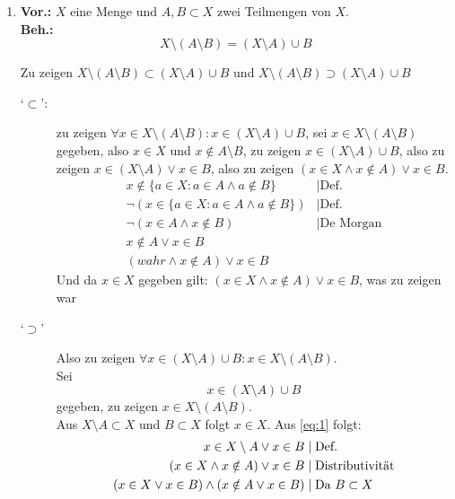 \documentclass{gadsescript}
\begin{document}
\begin{enumerate}[label=\alph*)]
	\item \textbf{Vor.:} $ X $ eine Menge und $ A, B \subset X $ zwei Teilmengen von $ X $.\\
		\textbf{Beh.:}
		\[ X \setminus ( A \setminus B ) = ( X \setminus A ) \cup B \]
		\begin{proof*}
			Zu zeigen $ X \setminus ( A \setminus B ) \subset ( X \setminus A ) \cup B $ und $ X \setminus ( A \setminus B ) \supset ( X \setminus A ) \cup B $
			\begin{description}
				\item[`$\subset$':] zu zeigen $ \forall x \in X \setminus ( A \setminus B ) : x \in ( X\setminus A) \cup B $, sei $ x \in X \setminus ( A \setminus B ) $ gegeben, also $ x \in X $ und $ x \notin A \setminus B $,
					zu zeigen $ x \in ( X \setminus A ) \cup B $, also zu zeigen $ x \in ( X \setminus A ) \vee x \in B $, also zu zeigen $ \left( x \in X \wedge  x \notin A \right) \vee x \in B $.
					\begin{align*}
						x \notin \{ a \in X : a \in A \wedge a \notin B \} &\mid \text{Def.}\\
						\neg \left( x \in \{ a \in X : a \in A \wedge a \notin B \} \right) &\mid \text{Def.}\\
						\neg \left( x \in A \wedge x \notin B \right) &\mid \text{De Morgan}\\
						x \notin A \vee x \in B \\
						\left( wahr \wedge x \notin A \right) \vee x \in B
					\end{align*}
					Und da $ x \in X $ gegeben gilt: $ \left( x \in X \wedge x \notin A \right) \vee x \in B $, was zu zeigen war
				\item[`$\supset$'] Also zu zeigen $ \forall x \in ( X \setminus A ) \cup B: x \in X \setminus ( A \setminus B )$.\\
					Sei \begin{equation} \label{eq:1} x \in ( X \setminus A ) \cup B \end{equation} gegeben,
					zu zeigen $ x \in X \setminus ( A \setminus B ) $.\\
					Aus $ X \setminus A \subset X $ und $ B \subset X $ folgt $ x \in X $.
					Aus \eqref{eq:1} folgt:
					\begin{align*}
						x \in X \setminus A \vee x \in B &\mid \text{Def.} \\
						( x \in X \wedge x \notin A ) \vee x \in B &\mid \text{Distributivität}\\
						( x \in X \vee x \in B ) \wedge ( x \notin A \vee x \in B ) &\mid \text{Da $ B \subset X $}\\

\end{align*}
\end{description}
\end{proof*}
\end{enumerate}
\end{document}
